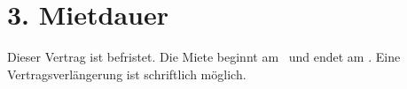 \section*{3. Mietdauer}
Dieser Vertrag ist befristet. Die Miete beginnt am \Rentstartdate\ und endet am \Rentenddate. Eine Vertragsverlängerung ist schriftlich möglich.
